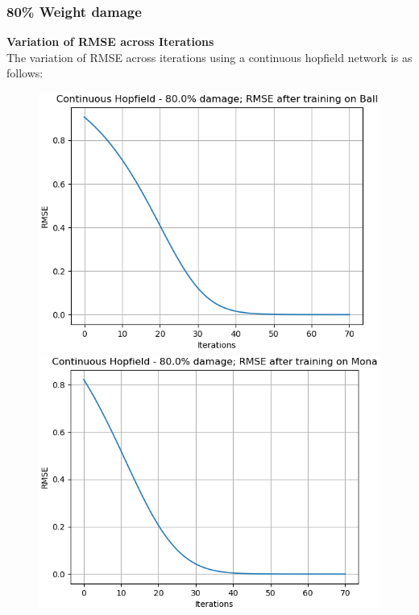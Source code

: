 \documentclass[12pt,a4paper]{article}
\begin{document}
\subsubsection{80\% Weight damage}
\textbf{Variation of RMSE across Iterations}\\
The variation of RMSE across iterations using a continuous hopfield network is as follows:
\begin{figure}[H]
\centering
\includegraphics[scale=0.4]{images/chn_80_ball.png}
\includegraphics[scale=0.4]{images/chn_80_mona.png}

\end{figure}
\end{document}
